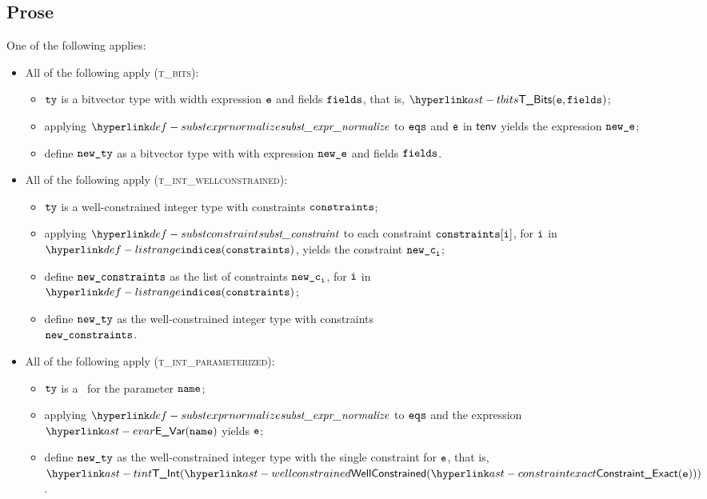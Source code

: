 \subsection{Prose}
One of the following applies:
\begin{itemize}
  \item All of the following apply (\textsc{t\_bits}):
  \begin{itemize}
    \item $\texttt{ty}$ is a bitvector type with width expression $\texttt{e}$ and fields $\texttt{fields}$, that is, $\TBits(\ve, \fields)$;
    \item applying $\substexprnormalize$ to $\texttt{eqs}$ and $\texttt{e}$ in $\textsf{tenv}$ yields the expression $\texttt{new\_e}$;
    \item define $\texttt{new\_ty}$ as a bitvector type with with expression $\texttt{new\_e}$ and fields $\texttt{fields}$.
  \end{itemize}

  \item All of the following apply (\textsc{t\_int\_wellconstrained}):
  \begin{itemize}
    \item $\texttt{ty}$ is a well-constrained integer type with constraints $\texttt{constraints}$;
    \item applying $\substconstraint$ to each constraint $\texttt{constraints}[\texttt{i}]$, for $\texttt{i}$ in \\
          $\listrange(\constraints)$, yields the constraint $\texttt{new\_c}_{\texttt{i}}$;
    \item define $\texttt{new\_constraints}$ as the list of constraints $\texttt{new\_c}_{\texttt{i}}$, for $\texttt{i}$ in \\
          $\listrange(\constraints)$;
    \item define $\texttt{new\_ty}$ as the well-constrained integer type with constraints \\
          $\texttt{new\_constraints}$.
  \end{itemize}

  \item All of the following apply (\textsc{t\_int\_parameterized}):
  \begin{itemize}
    \item $\texttt{ty}$ is a \parameterizedintegertype\ for the parameter $\texttt{name}$;
    \item applying $\substexprnormalize$ to $\texttt{eqs}$ and the expression $\EVar(\name)$ yields $\texttt{e}$;
    \item define $\texttt{new\_ty}$ as the well-constrained integer type with the single constraint for $\texttt{e}$, that is,
          $\TInt(\wellconstrained(\ConstraintExact(\ve)))$.
  \end{itemize}


\end{itemize}
